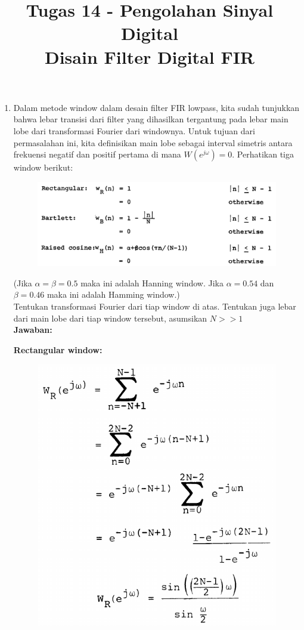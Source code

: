 \documentclass[12pt,a4paper]{article}
\title{Tugas 14 - Pengolahan Sinyal Digital\\
	Disain Filter Digital FIR}
\date{}
\begin{document}
	\maketitle
	\date{}
	\begin{enumerate}
		\item Dalam metode window dalam desain filter FIR lowpass, kita sudah tunjukkan bahwa lebar transisi dari filter yang dihasilkan tergantung pada lebar main lobe dari transformasi Fourier dari windownya. Untuk tujuan dari permasalahan ini, kita definisikan main lobe sebagai interval simetris antara frekuensi negatif dan positif pertama di mana $ W(e^{j\omega}) = 0 $. Perhatikan tiga window berikut:
		
		\begin{figure}[H]
			\centering
			\includegraphics[width=0.7\linewidth]{img/img01}
		\end{figure}
		
		(Jika $ \alpha = \beta = 0.5 $ maka ini adalah Hanning window. Jika $ \alpha = 0.54 $ dan $ \beta = 0.46 $ maka ini adalah Hamming window.)\\
		
		
		Tentukan transformasi Fourier dari tiap window di atas. Tentukan juga lebar dari main lobe dari tiap window tersebut, asumsikan $ N >> 1 $\\
		
		\pagebreak
		\textbf{Jawaban:}
		
		\textbf{Rectangular window:}
		
		\begin{figure}[H]
			\centering
			\includegraphics[width=0.6\linewidth]{img/img02}
		\end{figure}
		

\end{enumerate}
\end{document}
